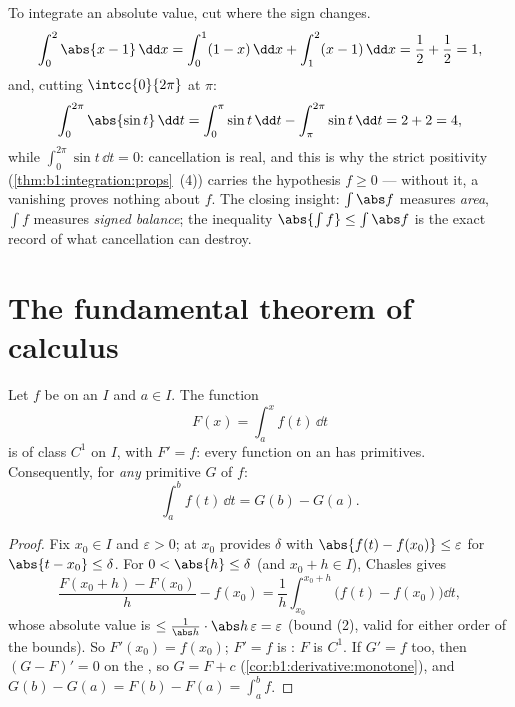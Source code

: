 \begin{example}\label{ex:b1:integration:chasleswork}
To integrate an absolute value, cut where the sign changes.
\[
\int_0^2 \abs{x - 1}\,\dd x
= \int_0^1 (1 - x)\,\dd x + \int_1^2 (x - 1)\,\dd x
= \frac12 + \frac12 = 1 ,
\]
and, cutting $\intcc{0}{2\pi}$ at $\pi$:
\[
\int_0^{2\pi} \abs{\sin t}\,\dd t
= \int_0^{\pi} \sin t\,\dd t - \int_{\pi}^{2\pi} \sin t\,\dd t
= 2 + 2 = 4 ,
\]
while $\int_0^{2\pi} \sin t\,\dd t = 0$: cancellation is real,
and this is why the strict positivity 
(\cref{thm:b1:integration:props}~(4)) carries the hypothesis $f
\geq 0$ --- without it, a vanishing  proves nothing
about $f$. The closing insight: $\int \abs f$ measures
\emph{area}, $\int f$ measures \emph{signed balance}; the
inequality $\abs{\int f} \leq \int\abs f$ is the exact record of
what cancellation can destroy.
\end{example}

\section{The fundamental theorem of calculus}

\begin{theorem}\label{thm:b1:integration:ftc}
Let $f$ be  on an  $I$ and $a \in I$. The function
\[
F(x) = \int_a^x f(t)\, \dd t
\]
is of class $C^1$ on $I$, with $F' = f$: every  function
on an  has primitives. Consequently, for \emph{any}
primitive $G$ of $f$:
\[
\int_a^b f(t)\,\dd t = G(b) - G(a) .
\]
\end{theorem}

\begin{proof}
Fix $x_0 \in I$ and $\varepsilon > 0$;  at $x_0$ provides
$\delta$ with $\abs{f(t) - f(x_0)} \leq \varepsilon$ for $\abs{t -
x_0} \leq \delta$. For $0 < \abs{h} \leq \delta$ (and $x_0 + h \in
I$), Chasles gives
\[
\frac{F(x_0 + h) - F(x_0)}{h} - f(x_0)
= \frac 1h \int_{x_0}^{x_0+h} \bigl(f(t) - f(x_0)\bigr)\dd t ,
\]
whose absolute value is $\leq \frac{1}{\abs h}\cdot \abs h\,
\varepsilon = \varepsilon$ (bound (2), valid for either order of the
bounds). So $F'(x_0) = f(x_0)$; $F' = f$ is : $F$ is
$C^1$. If $G' = f$ too, then $(G - F)' = 0$ on the , so $G =
F + c$ (\cref{cor:b1:derivative:monotone}), and $G(b) - G(a) = F(b)
- F(a) = \int_a^b f$.
\end{proof}

